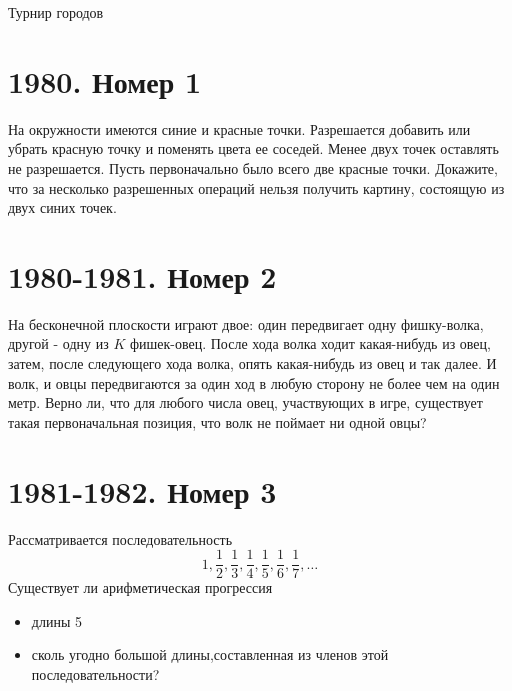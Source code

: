 \documentclass[11pt, a4paper]{common/document_template}
\begin{document}
\begin{titlepage}
  \begin{center}
	\Huge{Турнир городов}
  \end{center}
\end{titlepage}

\chapter{1980. Номер 1}

\begin{exercise}
На окружности имеются синие и красные точки. Разрешается добавить или убрать красную точку и поменять цвета ее соседей. Менее двух точек оставлять не разрешается. Пусть первоначально было всего две красные точки. Докажите, что за несколько разрешенных операций нельзя получить картину, состоящую из двух синих точек.
\end{exercise}

\chapter{1980-1981. Номер 2}

\begin{exercise}
На бесконечной плоскости играют двое: один передвигает одну фишку-волка, другой - одну из $K$ фишек-овец. После хода волка ходит какая-нибудь из овец, затем, после следующего хода волка, опять какая-нибудь из овец и так далее. И волк, и овцы передвигаются за один ход в любую сторону не более чем на один метр. Верно ли, что для любого числа овец, участвующих в игре, существует такая первоначальная позиция, что волк не поймает ни одной овцы?
\end{exercise}


\chapter{1981-1982. Номер 3}

\begin{exercise}
Рассматривается последовательность
$$
1, \frac{1}{2}, \frac{1}{3}, \frac{1}{4}, \frac{1}{5}, \frac{1}{6}, \frac{1}{7}, \dots
$$
Существует ли арифметическая прогрессия
\begin{itemize}
\item длины 5
\item сколь угодно большой длины,составленная из членов этой последовательности?
\end{itemize}
\end{exercise}
 
\end{document}
